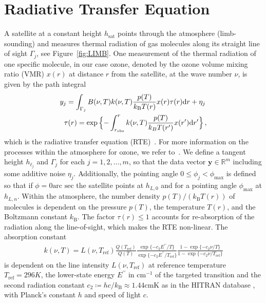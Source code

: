 \section{Radiative Transfer Equation}
A satellite at a constant height $h_{\text{sat}}$ points through the atmosphere (limb-sounding) and measures thermal radiation of gas molecules along its straight line of sight $\Gamma_j$, see  Figure~\ref{fig:LIMB}.
One measurement of the thermal radiation of one specific molecule, in our case ozone, denoted by the ozone volume mixing ratio (VMR) $x(r)$ at distance $r$ from the satellite, at the wave number $\nu$, is given by the path integral
\begin{align}
	\label{eq:RTE} 
	y_j =   \int_{\Gamma_j}  B(\nu,T) k(\nu, T)   \frac{p(T)}{k_{\text{B}} T(r)}  x(r)  \tau(r) \text{d}r + \eta_j \, \\
	\tau(r) = \exp{ \Bigl\{ - \int^{r}_{r_\text{obs}}  k(\nu, T)   \frac{p(T)}{k_B T(r^{\prime})}  x(r^{\prime}) \text{d}r^{\prime} \Bigr\} } \, ,\label{eq:absRTE} 
\end{align}
which is the radiative transfer equation (RTE)~\cite{mipas2000handbook}.
For more information on the processes within the atmosphere for ozone, we refer to~\cite{Lee2020NightOzone}.
We define a tangent height $h_{\ell_j}$ and $\Gamma_j$ for each $j=1,2,\ldots,m$, so that the data vector $\bm{y} \in \mathbb{R}^m$ including some additive noise $\eta_j$.
Additionally, the pointing angle $0 \leq \phi_j < \phi_{\text{max}}$ is defined so that if $\phi = 0 \text{arc sec}$ the satellite points at $h_{L,0}$ and for a pointing angle $\phi_{\text{max}}$ at $h_{L,n}$.
Within the atmosphere, the number density $p(T) / (k_{\text{B}} T(r))$ of molecules is dependent on the pressure $p(T)$, the temperature $T(r)$, and the Boltzmann constant $k_{\text{B}}$.
The factor $\tau(r)\leq 1$ accounts for re-absorption of the radiation along the line-of-sight, which makes the RTE non-linear.
The absorption constant
\begin{align}
	k(\nu, T) = L(\nu, T_{\text{ref}}) \frac{Q(T_{\text{ref}})}{Q(T)} \frac{ \exp{\{ - c_2 E^{\prime \prime} / T\}} }{\exp{\{ - c_2 E^{\prime \prime} / T_{\text{ref}} \}}} \frac{ 1- \exp{\{ - c_2 \nu  / T \}} }{1 - \exp{\{ - c_2 \nu / T_{\text{ref}} \}}}
\end{align}
is dependent on the line intensity $L(\nu, T_{\text{ref}})$ at reference temperature $T_{\text{ref}} =296K $, the lower-state energy $ E^{\prime \prime} $ in $\text{cm}^{-1}$ of the targeted transition and the second radiation constant $c_2\coloneqq hc/k_{\text{B}} \approx 1.44\text{cmK}$ as in the HITRAN database \cite{gordon2022hitran2020}, with Planck's constant $h$ and speed of light $c$.

